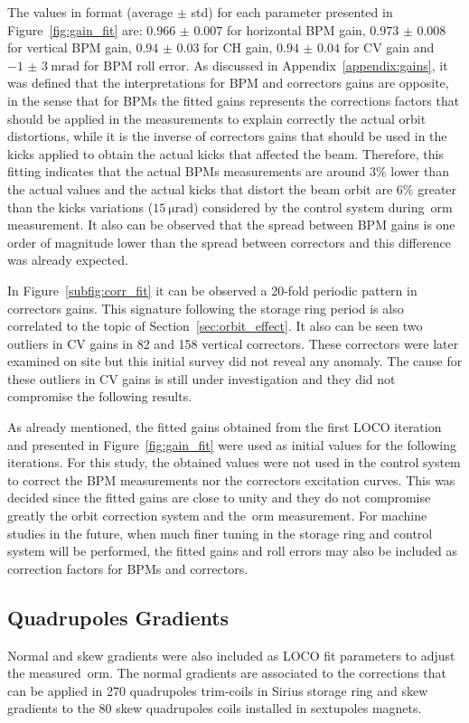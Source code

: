The values in format (average $\pm$ std) for each parameter presented in Figure~\ref{fig:gain_fit} are: $\num{0.966(7)}$ for horizontal BPM gain, $\num{0.973(8)}$ for vertical BPM gain, $\num{0.94(3)}$ for CH gain, $\num{0.94(4)}$ for CV gain and $\SI{-1(3)}{\milli\radian}$ for BPM roll error. As discussed in Appendix~\ref{appendix:gains}, it was defined that the interpretations for BPM and correctors gains are opposite, in the sense that for BPMs the fitted gains represents the corrections factors that should be applied in the measurements to explain correctly the actual orbit distortions, while it is the inverse of correctors gains that should be used in the kicks applied to obtain the actual kicks that affected the beam. Therefore, this fitting indicates that the actual BPMs measurements are around $3\%$ lower than the actual values and the actual kicks that distort the beam orbit are $6\%$ greater than the kicks variations ($\SI{15}{\micro\radian}$) considered by the control system during~\gls{orm} measurement. It also can be observed that the spread between BPM gains is one order of magnitude lower than the spread between correctors and this difference was already expected.

In Figure~\ref{subfig:corr_fit} it can be observed a 20-fold periodic pattern in correctors gains. This signature following the storage ring period is also correlated to the topic of Section~\ref{sec:orbit_effect}. It also can be seen two outliers in CV gains in 82 and 158 vertical correctors. These correctors were later examined on site but this initial survey did not reveal any anomaly. The cause for these outliers in CV gains is still under investigation and they did not compromise the following results.

As already mentioned, the fitted gains obtained from the first LOCO iteration and presented in Figure~\ref{fig:gain_fit} were used as initial values for the following iterations. For this study, the obtained values were not used in the control system to correct the BPM measurements nor the correctors excitation curves. This was decided since the fitted gains are close to unity and they do not compromise greatly the orbit correction system and the~\gls{orm} measurement. For machine studies in the future, when much finer tuning in the storage ring and control system will be performed, the fitted gains and roll errors may also be included as correction factors for BPMs and correctors.

\subsection{Quadrupoles Gradients}
Normal and skew gradients were also included as LOCO fit parameters to adjust the measured~\gls{orm}. The normal gradients are associated to the corrections that can be applied in 270 quadrupoles trim-coils in Sirius storage ring and skew gradients to the 80 skew quadrupoles coils installed in sextupoles magnets.


